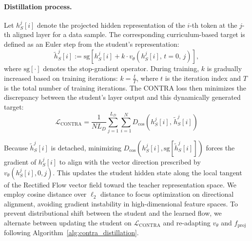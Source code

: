 \documentclass{article} %
\theoremstyle{definition}
\theoremstyle{remark}
\begin{document}
\paragraph{Distillation process. } Let
$h_S^{j}[i]$ denote the projected hidden representation of the $i$-th token at the $j$-th aligned layer for a data sample. The corresponding curriculum-based target is defined as an Euler step from the student's representation:
\begin{equation}
  \tilde{h}_S^{j}[i] := \mathrm{sg}\left[ h_S^{j}[i] + k \cdot v_\theta\left(h_S^{j}[i],\, t=0,\, j\right) \right],
  \label{eq:dynamic_target}
\end{equation}
where $\mathrm{sg}[\cdot]$ denotes the stop-gradient operator. During training, \(k\) is gradually increased based on training iterations: $k=\frac{t}{T}$, where $t$ is the iteration index and $T$ is the total number of training iterations. The CONTRA loss then minimizes the discrepancy between the student's layer output and this dynamically generated target:
\begin{equation}
\mathcal{L}_{\text{CONTRA}} = \frac{1}{N L_D} \sum_{j=1}^{L_D} \sum_{i=1}^{N} D_{\text{cos}}\left( h_S^{j}[i],\, \tilde{h}_S^{j}[i] \right)
\end{equation}

Because $\tilde{h}_S^{j}[i]$ is detached, minimizing $D_{\text{cos}}(h_S^{j}[i], \mathrm{sg}[\tilde{h}_S^j[i]])$ forces the gradient of $h_S^j[i]$ to align with the vector direction prescribed by $v_\theta(h_S^j[i], 0, j)$. This updates the student hidden state along the local tangent of the Rectified Flow vector field toward the teacher representation space. We employ cosine distance over $\ell_2$ distance to focus optimization on directional alignment, avoiding gradient instability in high-dimensional feature spaces. To prevent distributional shift between the student and the learned flow, we alternate between updating the student on $\mathcal{L}_{\text{CONTRA}}$ and re-adapting $v_\theta$ and $f_{\text{proj}}$ following Algorithm~\ref{alg:contra_distillation}.
\end{document}
